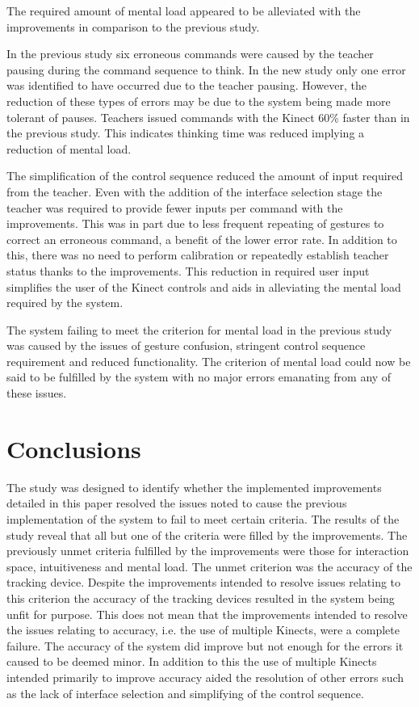 \documentclass[link]{IWCOMP}
\begin{document}
The required amount of mental load appeared to be alleviated with the improvements in comparison to the previous study.

In the previous study six erroneous commands were caused by the teacher pausing during the command sequence to think.
In the new study only one error was identified to have occurred due to the teacher pausing.
However, the reduction of these types of errors may be due to the system being made more tolerant of pauses.
Teachers issued commands with the Kinect 60\% faster than in the previous study.
This indicates thinking time was reduced implying a reduction of mental load.

The simplification of the control sequence reduced the amount of input required from the teacher.
Even with the addition of the interface selection stage the teacher was required to provide fewer inputs per command with the improvements.
This was in part due to less frequent repeating of gestures to correct an erroneous command, a benefit of the lower error rate.
In addition to this, there was no need to perform calibration or repeatedly establish teacher status thanks to the improvements.
This reduction in required user input simplifies the user of the Kinect controls and aids in alleviating the mental load required by the system.

The system failing to meet the criterion for mental load in the previous study was caused by the issues of gesture confusion, stringent control sequence requirement and reduced functionality.
The criterion of mental load could now be said to be fulfilled by the system with no major errors emanating from any of these issues.

\section{Conclusions}
\label{sec:conclusions}



The study was designed to identify whether the implemented improvements detailed in this paper resolved the issues noted to cause the previous implementation of the system to fail to meet certain criteria.
The results of the study reveal that all but one of the criteria were filled by the improvements.
The previously unmet criteria fulfilled by the improvements were those for interaction space, intuitiveness and mental load.
The unmet criterion was the accuracy of the tracking device.
Despite the improvements intended to resolve issues relating to this criterion the accuracy of the tracking devices resulted in the system being unfit for purpose.
This does not mean that the improvements intended to resolve the issues relating to accuracy, i.e. the use of multiple Kinects, were a complete failure.
The accuracy of the system did improve but not enough for the errors it caused to be deemed minor.
In addition to this the use of multiple Kinects intended primarily to improve accuracy aided the resolution of other errors such as the lack of interface selection and simplifying of the control sequence.
\end{document}
